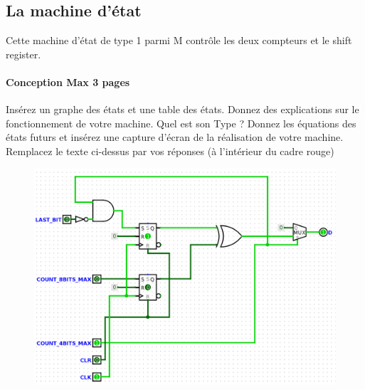 \documentclass[a4paper]{article} %
\begin{document}
\subsection{La machine d’état}
Cette machine d’état de type 1 parmi M contrôle les deux compteurs et le shift register. 
\begin{tcolorbox}[colframe=Monokaimagenta,colback=white]
\paragraph{Conception Max 3 pages}
Insérez un graphe des états et une table des états. Donnez des explications sur le fonctionnement de votre machine. Quel est son Type ?
Donnez les équations des états futurs et insérez une capture d’écran de la réalisation de votre machine.
Remplacez le texte ci-dessus par vos réponses (à l’intérieur du cadre rouge)\\

\begin{figure}[H]
\centering
    \includegraphics[width=.8\textwidth]{src/STAMAC_V2.png}
    \label{fig:stamac}
\end{figure}



\end{tcolorbox}
\end{document}
